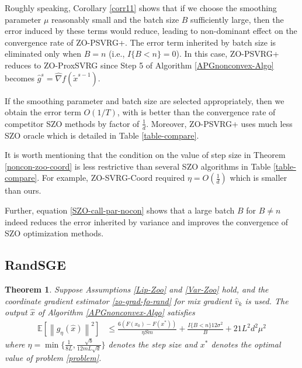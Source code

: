 \documentclass{article}
\newcommand*{\E}{\mathbb{E}}
\newcommand{\norm}[1]{\left\lVert#1\right\rVert}
\newtheorem{theorem}{Theorem}[section]
\theoremstyle{definition}
\theoremstyle{remark}
\begin{document}
Roughly speaking, Corollary \ref{corr11} shows  that if we choose the smoothing parameter $\mu$ reasonably small and the batch size $B$ sufficiently large, then the error induced by these terms would reduce, leading to non-dominant effect on the convergence rate of ZO-PSVRG+.
The error term inherited by batch size  is eliminated only when $B = n$  (i.e., $I\{B < n\} = 0$). In
this case, ZO-PSVRG+ reduces to ZO-ProxSVRG since Step 5 of Algorithm \ref{APGnonconvex-Algo} becomes $\hat{g}^s = \hat{\nabla} f(\tilde{x}^{s-1})$. 

If the smoothing parameter and batch size are selected appropriately, then we obtain the error term $O(1/T)$, with is better than the convergence rate of competitor SZO methods by factor of $\frac{1}{d}$. Moreover, ZO-PSVRG+ uses much less SZO oracle which is detailed in Table \ref{table-compare}.

It is worth mentioning that the condition on the value of step size in Theorem \ref{noncon-zoo-coord} is less restrictive than several SZO algorithms  in Table \ref{table-compare}. For example, ZO-SVRG-Coord required $\eta = O(\frac{1}{d})$ which is smaller than ours. 


{\color{Brown}
Further, equation \eqref{SZO-call-par-nocon} shows that a large batch $B$  for $B \neq n$ indeed reduces the error inherited by variance and improves the convergence of SZO optimization methods.
}
\subsection{RandSGE}
\begin{theorem}\label{noncon-zoo-rand}
Suppose Assumptions \ref{Lip-Zoo} and \ref{Var-Zoo} hold, and the coordinate gradient estimator \eqref{zo-grad-fo-rand} for mix gradient $\hat{v}_k$ is used. The output $\hat{x}$ of Algorithm \ref{APGnonconvex-Algo} satisfies
  \begin{equation}\label{noncon-zoo-rand}
  \begin{split}
\E[\norm{g_{\eta}(\hat{x})}^2] & \leq \frac{6\left(F(x_0) - F({x}^*)\right)}{\eta Sm} + \frac{I\{B < n\}12\sigma ^2}{B}+21{L^2 d^2 \mu^2}
\end{split}
 \end{equation}
where $\eta = \min\{\frac{1}{8L}, \frac{\sqrt{b}}{12mL\sqrt{d}}\}$ denotes the step size and $x^*$ denotes the optimal value of problem \ref{problem}.
\end{theorem}
\end{document}
